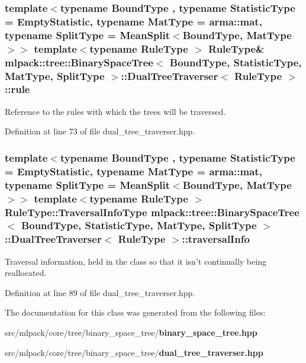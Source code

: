 \subsubsection[{rule}]{\setlength{\rightskip}{0pt plus 5cm}template$<$typename Bound\-Type , typename Statistic\-Type  = Empty\-Statistic, typename Mat\-Type  = arma\-::mat, typename Split\-Type  = Mean\-Split$<$\-Bound\-Type, Mat\-Type$>$$>$ template$<$typename Rule\-Type $>$ Rule\-Type\& {\bf mlpack\-::tree\-::\-Binary\-Space\-Tree}$<$ Bound\-Type, Statistic\-Type, Mat\-Type, Split\-Type $>$\-::{\bf Dual\-Tree\-Traverser}$<$ Rule\-Type $>$\-::rule\hspace{0.3cm}{\ttfamily [private]}}\label{classmlpack_1_1tree_1_1BinarySpaceTree_1_1DualTreeTraverser_a2ca4ff447421dab63f16cb3ea6d5a3c7}


Reference to the rules with which the trees will be traversed. 



Definition at line 73 of file dual\-\_\-tree\-\_\-traverser.\-hpp.

\subsubsection[{traversal\-Info}]{\setlength{\rightskip}{0pt plus 5cm}template$<$typename Bound\-Type , typename Statistic\-Type  = Empty\-Statistic, typename Mat\-Type  = arma\-::mat, typename Split\-Type  = Mean\-Split$<$\-Bound\-Type, Mat\-Type$>$$>$ template$<$typename Rule\-Type $>$ Rule\-Type\-::\-Traversal\-Info\-Type {\bf mlpack\-::tree\-::\-Binary\-Space\-Tree}$<$ Bound\-Type, Statistic\-Type, Mat\-Type, Split\-Type $>$\-::{\bf Dual\-Tree\-Traverser}$<$ Rule\-Type $>$\-::traversal\-Info\hspace{0.3cm}{\ttfamily [private]}}\label{classmlpack_1_1tree_1_1BinarySpaceTree_1_1DualTreeTraverser_a094bc9ebc23928f2559f75ea51c586f0}


Traversal information, held in the class so that it isn't continually being reallocated. 



Definition at line 89 of file dual\-\_\-tree\-\_\-traverser.\-hpp.



The documentation for this class was generated from the following files\-:\begin{DoxyCompactItemize}
\item 
src/mlpack/core/tree/binary\-\_\-space\-\_\-tree/{\bf binary\-\_\-space\-\_\-tree.\-hpp}\item 
src/mlpack/core/tree/binary\-\_\-space\-\_\-tree/{\bf dual\-\_\-tree\-\_\-traverser.\-hpp}\end{DoxyCompactItemize}
